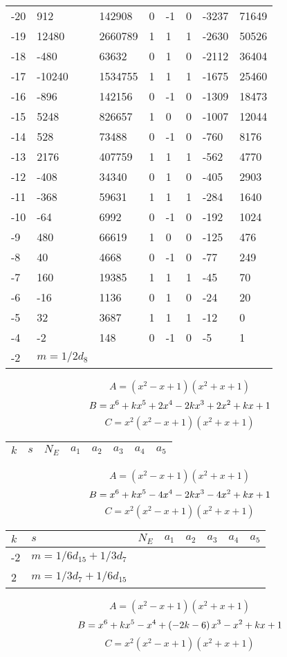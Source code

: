 \documentclass{amsart}
\begin{document}
\begin{longtable}{|l|l|l|lllll|}
-20&912&142908&0&-1&0&-3237&71649\\
-19&12480&2660789&1&1&1&-2630&50526\\
-18&-480&63632&0&1&0&-2112&36404\\
-17&-10240&1534755&1&1&1&-1675&25460\\
-16&-896&142156&0&-1&0&-1309&18473\\
-15&5248&826657&1&0&0&-1007&12044\\
-14&528&73488&0&-1&0&-760&8176\\
-13&2176&407759&1&1&1&-562&4770\\
-12&-408&34340&0&1&0&-405&2903\\
-11&-368&59631&1&1&1&-284&1640\\
-10&-64&6992&0&-1&0&-192&1024\\
-9&480&66619&1&0&0&-125&476\\
-8&40&4668&0&-1&0&-77&249\\
-7&160&19385&1&1&1&-45&70\\
-6&-16&1136&0&1&0&-24&20\\
-5&32&3687&1&1&1&-12&0\\
-4&-2&148&0&-1&0&-5&1\\
-2&$m=1/2d_{8}$&&\multicolumn{5}{c|}{}\\
\hline
\end{longtable}
$$A=(x^2
 - x
 + 1)(x^2
 + x
 + 1)$$
$$B=x^6
 + k\*x^5
 + 2\*x^4
 - 2\*k\*x^3
 + 2\*x^2
 + k\*x
 + 1$$
$$C=x^2(x^2
 - x
 + 1)(x^2
 + x
 + 1)$$
\begin{longtable}{|l|l|l|lllll|}
\hline
$k$ & $s$ & $N_E$ & $a_1$ & $a_2$ & $a_3$ & $a_4$ & $a_5$\\
\hline
\hline
\end{longtable}
$$A=(x^2
 - x
 + 1)(x^2
 + x
 + 1)$$
$$B=x^6
 + k\*x^5
 - 4\*x^4
 - 2\*k\*x^3
 - 4\*x^2
 + k\*x
 + 1$$
$$C=x^2(x^2
 - x
 + 1)(x^2
 + x
 + 1)$$
\begin{longtable}{|l|l|l|lllll|}
\hline
$k$ & $s$ & $N_E$ & $a_1$ & $a_2$ & $a_3$ & $a_4$ & $a_5$\\
\hline
-2&$m=1/6d_{15}+1/3d_{7}$&&\multicolumn{5}{c|}{}\\
2&$m=1/3d_{7}+1/6d_{15}$&&\multicolumn{5}{c|}{}\\
\hline
\end{longtable}
$$A=(x^2
 - x
 + 1)(x^2
 + x
 + 1)$$
$$B=x^6
 + k\*x^5
 - x^4
 + \left(-2\*k
 - 6\right) \*x^3
 - x^2
 + k\*x
 + 1$$
$$C=x^2(x^2
 - x
 + 1)(x^2
 + x
 + 1)$$
\end{document}
